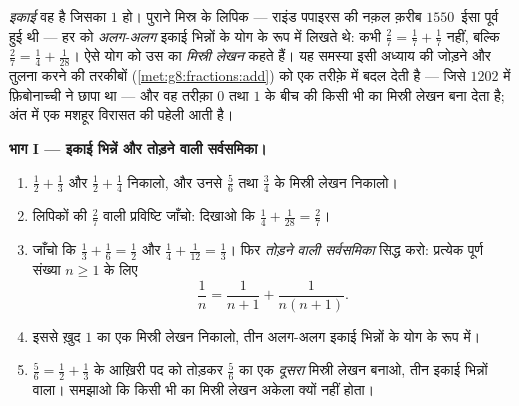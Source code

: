 \begin{problem}
\label{pb:g8:fractions:1}
\emph{इकाई } वह  है जिसका  $1$ हो। पुराने मिस्र के
लिपिक --- राइंड पपाइरस की नक़ल क़रीब $1550$~ईसा पूर्व हुई थी ---
हर  को \emph{अलग-अलग} इकाई भिन्नों के योग के रूप में लिखते थे:
कभी $\frac27 = \frac17 + \frac17$ नहीं, बल्कि
$\frac27 = \frac14 + \frac{1}{28}$। ऐसे योग को उस  का
\emph{मिस्री लेखन} कहते हैं। यह समस्या इसी अध्याय की जोड़ने और तुलना
करने की तरकीबों (\cref{met:g8:fractions:add}) को एक तरीक़े में बदल
देती है --- जिसे $1202$ में फ़िबोनाच्ची ने छापा था --- और वह तरीक़ा
$0$ तथा $1$ के बीच की किसी भी  का मिस्री लेखन बना देता है; अंत
में एक मशहूर विरासत की पहेली आती है।

\medskip
\noindent\textbf{भाग I --- इकाई भिन्नें और तोड़ने वाली
सर्वसमिका।}
\begin{enumerate}
  \item $\frac12 + \frac13$ और $\frac12 + \frac14$ निकालो, और उनसे
        $\frac56$ तथा $\frac34$ के मिस्री लेखन निकालो।
  \item लिपिकों की $\frac27$ वाली प्रविष्टि जाँचो: दिखाओ कि
        $\frac14 + \frac{1}{28} = \frac27$।
  \item जाँचो कि $\frac13 + \frac16 = \frac12$ और
        $\frac14 + \frac{1}{12} = \frac13$। फिर \emph{तोड़ने वाली
        सर्वसमिका} सिद्ध करो: प्रत्येक पूर्ण संख्या $n \geq 1$ के
        लिए
        \[
        \frac{1}{n} = \frac{1}{n+1} + \frac{1}{n(n+1)} .
        \]
  \item इससे ख़ुद $1$ का एक मिस्री लेखन निकालो, तीन अलग-अलग इकाई
        भिन्नों के योग के रूप में।
  \item $\frac56 = \frac12 + \frac13$ के आख़िरी पद को तोड़कर
        $\frac56$ का एक \emph{दूसरा} मिस्री लेखन बनाओ, तीन इकाई
        भिन्नों वाला। समझाओ कि किसी भी  का मिस्री लेखन अकेला
        क्यों नहीं होता।
\end{enumerate}


\end{problem}
